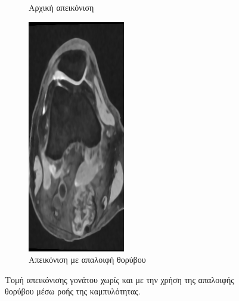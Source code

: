 \documentclass[a4paper,12pt]{article}
\begin{document}
\begin{figure}[H]
\begin{subfigure}[t]{0.4\linewidth}
    \caption{Αρχική απεικόνιση}
    \end{subfigure}
    \begin{subfigure}[t]{0.4\linewidth}
    \includegraphics[width=\linewidth]{curvature_3.png}
    \caption{Απεικόνιση με απαλοιφή θορύβου}
    \end{subfigure}

    \caption{Τομή απεικόνισης γονάτου χωρίς και με την χρήση της απαλοιφής
    θορύβου μέσω ροής της καμπυλότητας.}
    \label{fig:curvature_flow:3}
\end{figure}
\end{document}
